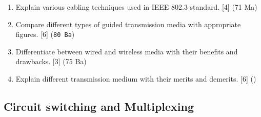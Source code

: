\documentclass[12pt]{article}
\begin{document}
\begin{enumerate}[noitemsep, topsep=0pt]
    		\item Explain various cabling techniques used in IEEE 802.3 standard. \hfill [4] (71 Ma)
    
    		\item Compare different types of guided transmission media with appropriate figures. \hfill [6] (\texttt{80 Ba})
    		
    		\item Differentiate between wired and wireless media with their benefits and drawbacks. \hfill [3] (75 Ba)
    
    		\item Explain different transmission medium with their merits and demerits. \hfill [6] ()
		\end{enumerate}

	\subsection{Circuit switching and Multiplexing}
\end{document}
